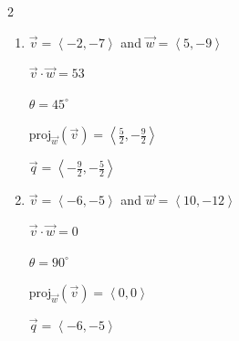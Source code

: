 \documentclass{ximera}
\begin{document}
	\author{Stitz-Zeager}


\begin{multicols}{2} \raggedcolumns 

\begin{enumerate}

\item $\overrightarrow{v} = \left\langle -2, -7 \right\rangle$ and $\overrightarrow{w} = \left\langle 5, -9 \right\rangle$

 $\overrightarrow{v} \cdot \overrightarrow{w} = 53$

 $\theta =  45^{\circ}$ 

 $\text{proj}_{\overrightarrow{w}}(\overrightarrow{v}) = \left\langle \frac{5}{2}, -\frac{9}{2} \right\rangle$

 $\overrightarrow{q} = \left\langle -\frac{9}{2}, -\frac{5}{2} \right\rangle$
 
 \vfill
 
\item $\overrightarrow{v} = \left\langle -6, -5 \right\rangle$ and $\overrightarrow{w} = \left\langle 10, -12 \right\rangle$

 $\overrightarrow{v} \cdot \overrightarrow{w} = 0$

 $\theta =  90^{\circ}$ 

 $\text{proj}_{\overrightarrow{w}}(\overrightarrow{v}) = \left\langle 0, 0 \right\rangle$

 $\overrightarrow{q} = \left\langle -6, -5 \right\rangle$ 

 
\setcounter{HW}{\value{enumi}}
\end{enumerate}
\end{multicols}
\end{document}
